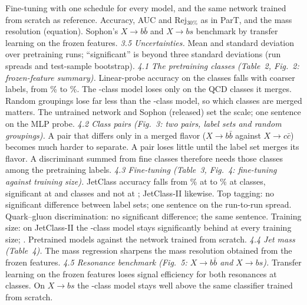 { Fine-tuning with one schedule for every model, and the same network trained from scratch as reference.
 Accuracy, AUC and Rej$_{30\%}$ as in ParT, and the mass resolution (equation).
 Sophon's $X\to b\bar b$ and $X\to bs$ benchmark by transfer learning on the frozen features.
 \textit{3.5 Uncertainties.} Mean and standard deviation over pretraining runs; ``significant'' is beyond three standard deviations (run spreads and test-sample bootstrap).
 \textit{4.1 The pretraining classes (Table~2, Fig.~2: frozen-feature summary).} Linear-probe accuracy on the \Kfull{} classes falls with coarser labels, from \VtwoAccFullPct\% to \VtwoAccCoarsePct\%.
 The \Kres-class model loses only on the QCD classes it merges.
 Random groupings lose far less than the \Kcoarse-class model, so which classes are merged matters.
 The untrained network and Sophon (released) set the scale; one sentence on the MLP probe.
 \textit{4.2 Class pairs (Fig.~3: two pairs, label sets and random groupings).} A pair that differs only in a merged flavor ($X\to b\bar b$ against $X\to c\bar c$) becomes much harder to separate.
 A pair loses little until the label set merges its flavor.
 A discriminant summed from fine classes therefore needs those classes among the pretraining labels.
 \textit{4.3 Fine-tuning (Table~3, Fig.~4: fine-tuning against training size).} JetClass accuracy falls from \VtwoFtJcOneFullPct\% at \Kfull{} to \VtwoFtJcOneCoarsePct\% at \Kcoarse{} classes, significant at \Kmid{} and \Kcoarse{} classes and not at \Kres; JetClass-II likewise.
 Top tagging: no significant difference between label sets; one sentence on the run-to-run spread.
 Quark--gluon discrimination: no significant difference; the same sentence.
 Training size: on JetClass-II the \Kcoarse-class model stays significantly behind at every training size; .
 Pretrained models against the network trained from scratch.
 \textit{4.4 Jet mass (Table~4).} The mass regression sharpens the mass resolution obtained from the frozen features.
 
 \textit{4.5 Resonance benchmark (Fig.~5: $X\to b\bar b$ and $X\to bs$).} Transfer learning on the frozen features loses signal efficiency for both resonances at \Kcoarse{} classes.
 On $X\to bs$ the \Kfull-class model stays well above the same classifier trained from scratch.
}
